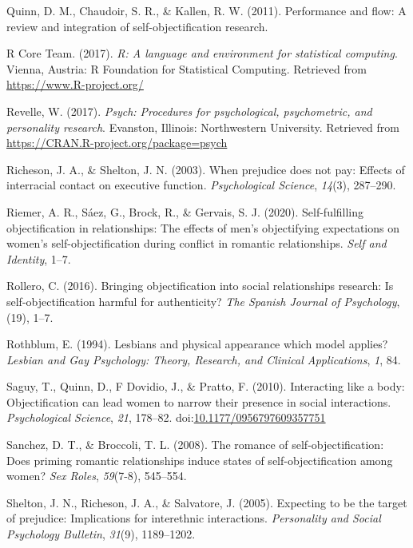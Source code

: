 \documentclass[man]{apa6}
\begin{document}
\hypertarget{ref-quinn2011performance}{}
Quinn, D. M., Chaudoir, S. R., \& Kallen, R. W. (2011). Performance and
flow: A review and integration of self-objectification research.

\hypertarget{ref-R-base}{}
R Core Team. (2017). \emph{R: A language and environment for statistical
computing}. Vienna, Austria: R Foundation for Statistical Computing.
Retrieved from \url{https://www.R-project.org/}

\hypertarget{ref-R-psych}{}
Revelle, W. (2017). \emph{Psych: Procedures for psychological,
psychometric, and personality research}. Evanston, Illinois:
Northwestern University. Retrieved from
\url{https://CRAN.R-project.org/package=psych}

\hypertarget{ref-richeson2003prejudice}{}
Richeson, J. A., \& Shelton, J. N. (2003). When prejudice does not pay:
Effects of interracial contact on executive function.
\emph{Psychological Science}, \emph{14}(3), 287--290.

\hypertarget{ref-riemer2020self}{}
Riemer, A. R., Sáez, G., Brock, R., \& Gervais, S. J. (2020).
Self-fulfilling objectification in relationships: The effects of men's
objectifying expectations on women's self-objectification during
conflict in romantic relationships. \emph{Self and Identity}, 1--7.

\hypertarget{ref-rollero2016bringing}{}
Rollero, C. (2016). Bringing objectification into social relationships
research: Is self-objectification harmful for authenticity? \emph{The
Spanish Journal of Psychology}, (19), 1--7.

\hypertarget{ref-rothblum1994lesbians}{}
Rothblum, E. (1994). Lesbians and physical appearance which model
applies? \emph{Lesbian and Gay Psychology: Theory, Research, and
Clinical Applications}, \emph{1}, 84.

\hypertarget{ref-saguyetal2010}{}
Saguy, T., Quinn, D., F Dovidio, J., \& Pratto, F. (2010). Interacting
like a body: Objectification can lead women to narrow their presence in
social interactions. \emph{Psychological Science}, \emph{21}, 178--82.
doi:\href{https://doi.org/10.1177/0956797609357751}{10.1177/0956797609357751}

\hypertarget{ref-sanchez2008romance}{}
Sanchez, D. T., \& Broccoli, T. L. (2008). The romance of
self-objectification: Does priming romantic relationships induce states
of self-objectification among women? \emph{Sex Roles}, \emph{59}(7-8),
545--554.

\hypertarget{ref-shelton2005expecting}{}
Shelton, J. N., Richeson, J. A., \& Salvatore, J. (2005). Expecting to
be the target of prejudice: Implications for interethnic interactions.
\emph{Personality and Social Psychology Bulletin}, \emph{31}(9),
1189--1202.
\end{document}
